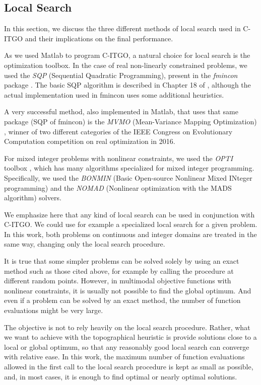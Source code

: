 \subsection{Local Search}

In this section, we discuss the three different methods of local search used in C-ITGO and their implications on the final performance.

As we used Matlab to program C-ITGO, a natural choice for local search is the optimization toolbox. In the case of real non-linearly constrained problems, we used the \textit{SQP} (Sequential Quadratic Programming), present in the \textit{fmincon} package \citep{fmincon}. The basic SQP algorithm is described in Chapter 18 of \cite{Nocedal}, although the actual implementation used in fmincon uses some additional heuristics. 

A very successful method, also implemented in Matlab, that uses that same package (SQP of fmincon) is the \textit{MVMO} (Mean-Variance Mapping Optimization) \citep{MVMO}, winner of two different categories of the IEEE Congress on Evolutionary Computation competition on real optimization in 2016.

For mixed integer problems with nonlinear constraints, we used the \textit{OPTI} toolbox \citep{OPTI}, which has many algorithms specialized for mixed integer programming. Specifically, we used the \textit{BONMIN} (Basic Open-source Nonlinear Mixed INteger programming) \citep{BONMIN} and the \textit{NOMAD} (Nonlinear optimization with the MADS algorithm) \citep{NOMAD} solvers.

We emphasize here that any kind of local search can be used in conjunction with C-ITGO. We could use for example a specialized local search for a given problem. In this work, both problems on continuous and integer domains are treated in the same way, changing only the local search procedure.

It is true that some simpler problems can be solved solely by using an exact method such as those cited above, for example by calling the procedure at different random points. However, in multimodal objective functions with nonlinear constraints, it is usually not possible to find the global optimum. And even if a problem can be solved by an exact method, the number of function evaluations might be very large.

The objective is not to rely heavily on the local search procedure. Rather, what we want to achieve with the topographical heuristic is provide solutions close to a local or global optimum, so that any reasonably good local search can converge with relative ease. In this work, the maximum number of function evaluations allowed in the first call to the local search procedure is kept as small as possible, and, in most cases, it is enough to find optimal or nearly optimal solutions.



